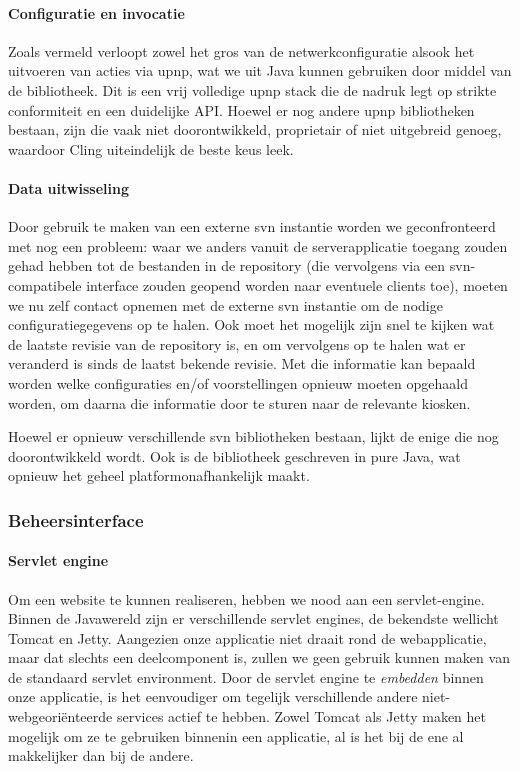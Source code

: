 \paragraph{Configuratie en invocatie} Zoals vermeld verloopt zowel het gros van de netwerkconfiguratie alsook het uitvoeren van acties via \ac{upnp}, wat we uit Java kunnen gebruiken door middel van de  bibliotheek. Dit is een vrij volledige \ac{upnp} stack die de nadruk legt op strikte conformiteit en een duidelijke API. Hoewel er nog andere \ac{upnp} bibliotheken bestaan, zijn die vaak niet doorontwikkeld, proprietair of niet uitgebreid genoeg, waardoor Cling uiteindelijk de beste keus leek.

\paragraph{Data uitwisseling} Door gebruik te maken van een externe \ac{svn} instantie worden we geconfronteerd met nog een probleem: waar we anders vanuit de serverapplicatie toegang zouden gehad hebben tot de bestanden in de repository (die vervolgens via een \ac{svn}-compatibele interface zouden geopend worden naar eventuele clients toe), moeten we nu zelf contact opnemen met de externe \ac{svn} instantie om de nodige configuratiegegevens op te halen. Ook moet het mogelijk zijn snel te kijken wat de laatste revisie van de repository is, en om vervolgens op te halen wat er veranderd is sinds de laatst bekende revisie. Met die informatie kan bepaald worden welke configuraties en/of voorstellingen opnieuw moeten opgehaald worden, om daarna die informatie door te sturen naar de relevante kiosken.

Hoewel er opnieuw verschillende \ac{svn} bibliotheken bestaan, lijkt  de enige die nog doorontwikkeld wordt. Ook is de bibliotheek geschreven in pure Java, wat opnieuw het geheel platformonafhankelijk maakt.

\subsubsection{Beheersinterface}

\paragraph{Servlet engine} Om een website te kunnen realiseren, hebben we nood aan een servlet-engine. Binnen de Javawereld zijn er verschillende servlet engines, de bekendste wellicht Tomcat en Jetty. Aangezien onze applicatie niet draait rond de webapplicatie, maar dat slechts een deelcomponent is, zullen we geen gebruik kunnen maken van de standaard servlet environment. Door de servlet engine te \emph{embedden} binnen onze applicatie, is het eenvoudiger om tegelijk verschillende andere niet-webgeoriënteerde services actief te hebben. Zowel Tomcat als Jetty maken het mogelijk om ze te gebruiken binnenin een applicatie, al is het bij de ene al makkelijker dan bij de andere.


